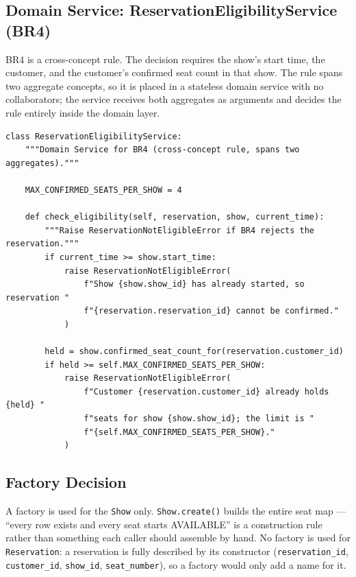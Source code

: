 \documentclass[11pt,a4paper]{article}
\newcommand{\code}[1]{\texttt{#1}}
\begin{document}
\subsection{Domain Service: ReservationEligibilityService (BR4)}

BR4 is a cross-concept rule. The decision requires the show's start time, the
customer, and the customer's confirmed seat count in that show. The rule spans
two aggregate concepts, so it is placed in a stateless domain service with no
collaborators; the service receives both aggregates as arguments and decides
the rule entirely inside the domain layer.

\begin{lstlisting}[style=python,caption={\code{ReservationEligibilityService}\ --- BR4 as a Domain Service.},label=lst:br4]
class ReservationEligibilityService:
    """Domain Service for BR4 (cross-concept rule, spans two aggregates)."""

    MAX_CONFIRMED_SEATS_PER_SHOW = 4

    def check_eligibility(self, reservation, show, current_time):
        """Raise ReservationNotEligibleError if BR4 rejects the reservation."""
        if current_time >= show.start_time:
            raise ReservationNotEligibleError(
                f"Show {show.show_id} has already started, so reservation "
                f"{reservation.reservation_id} cannot be confirmed."
            )

        held = show.confirmed_seat_count_for(reservation.customer_id)
        if held >= self.MAX_CONFIRMED_SEATS_PER_SHOW:
            raise ReservationNotEligibleError(
                f"Customer {reservation.customer_id} already holds {held} "
                f"seats for show {show.show_id}; the limit is "
                f"{self.MAX_CONFIRMED_SEATS_PER_SHOW}."
            )
\end{lstlisting}

\subsection{Factory Decision}

A factory is used for the \code{Show} only. \code{Show.create()} builds the
entire seat map --- ``every row exists and every seat starts AVAILABLE'' is a
construction rule rather than something each caller should assemble by hand.
No factory is used for \code{Reservation}: a reservation is fully described by
its constructor (\code{reservation\_id}, \code{customer\_id}, \code{show\_id},
\code{seat\_number}), so a factory would only add a name for it.
\end{document}

